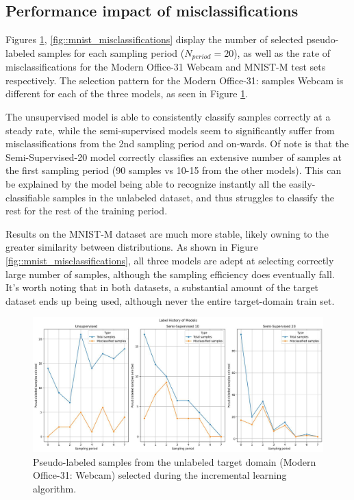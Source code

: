 \documentclass{article}
\begin{document}
	
	\subsection{Performance impact of misclassifications}
	
	
	Figures \ref{fig::office_misclassifications}, \ref{fig::mnist_misclassifications} display the number of selected pseudo-labeled samples for each sampling period ($N_{period}=20$), as well as the rate of misclassifications for the Modern Office-31 Webcam and MNIST-M test sets respectively. The selection pattern for the Modern Office-31: samples Webcam is different for each of the three models, as seen in Figure \ref{fig::office_misclassifications}. 
	
	The unsupervised model is able to consistently classify samples correctly at a steady rate, while the semi-supervised models seem to significantly suffer from misclassifications from the 2nd sampling period and on-wards. Of note is that the Semi-Supervised-20 model correctly classifies an extensive number of samples at the first sampling period (90 samples vs 10-15 from the other models). This can be explained by the model being able to recognize instantly all the easily-classifiable samples in the unlabeled dataset, and thus struggles to classify the rest for the rest of the training period. 
	
	Results on the MNIST-M dataset are much more stable, likely owning to the greater similarity between distributions. As shown in Figure \ref{fig::mnist_misclassifications}, all three models are adept at selecting correctly large number of samples, although the sampling efficiency does eventually fall. It's worth noting that in both datasets, a substantial amount of the target dataset ends up being used, although never the entire target-domain train set.

	
	\begin{figure}
		\centering
		\includegraphics[width=12cm]{"office_misclassifications.jpeg"}
		\caption{Pseudo-labeled samples from the unlabeled target domain (Modern Office-31: Webcam) selected during the incremental learning algorithm.}
		\label{fig::office_misclassifications}
	\end{figure}
\end{document}
